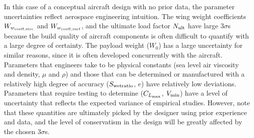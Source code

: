 In this case of a conceptual aircraft design with no prior data,
the parameter uncertainties reflect aerospace engineering intuition.
The wing weight coefficients $W_{w_{\rm{coeff,strc}}}$ and $W_{w_{\rm{coeff,surf}}}$,
and the ultimate load factor $N_{\rm{ult}}$ have
large $3\sigma$s because the build quality of aircraft components is
often difficult to quantify with a large degree of certainty.
The payload weight ($W_0$) has a large uncertainty for similar reasons,
since it is often developed concurrently with the aircraft.
Parameters that engineers take to be
physical constants (sea level air viscosity and density, $\mu$ and $\rho$) and those that can be determined or manufactured with a relatively
high degree of accuracy ($S_{\rm{wetratio}}$, $e$) have relatively low deviations.
Parameters that require testing to determine ($C_{L_{\rm{max}}}$, $V_{\rm{min}}$) have a level of uncertainty
that reflects the expected variance of empirical studies. However, note that
these quantities are ultimately picked by the designer using prior experience and data,
and the level of conservatism in the
design will be greatly affected by the chosen $3\sigma$s.
